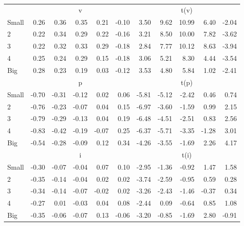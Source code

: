 \begin{table}[!ht]
\begin{tabular}{lrrrrrrrrrr}
  
    
      & \multicolumn{5}{c}{v} & \multicolumn{5}{c}{t(v)}
    
    \\
      \cmidrule(r){2-6} \cmidrule(r){7-11}

    Small   & 0.26  & 0.36  & 0.35  & 0.21  & -0.10  & 3.50  & 9.62  & 10.99  & 6.40  & -2.04  \\
         2  & 0.22  & 0.34  & 0.29  & 0.22  & -0.16  & 3.21  & 8.50  & 10.00  & 7.82  & -3.62  \\
         3  & 0.22  & 0.32  & 0.33  & 0.29  & -0.18  & 2.84  & 7.77  & 10.12  & 8.63  & -3.94  \\
         4  & 0.25  & 0.24  & 0.29  & 0.15  & -0.18  & 3.06  & 5.21  & 8.30  & 4.44  & -3.54  \\
    Big     & 0.28  & 0.23  & 0.19  & 0.03  & -0.12  & 3.53  & 4.80  & 5.84  & 1.02  & -2.41  \\

  
    
      & \multicolumn{5}{c}{p} & \multicolumn{5}{c}{t(p)}
    
    \\
      \cmidrule(r){2-6} \cmidrule(r){7-11}

    Small   & -0.70  & -0.31  & -0.12  & 0.02  & 0.06  & -5.81  & -5.12  & -2.42  & 0.46  & 0.74  \\
         2  & -0.76  & -0.23  & -0.07  & 0.04  & 0.15  & -6.97  & -3.60  & -1.59  & 0.99  & 2.15  \\
         3  & -0.79  & -0.29  & -0.13  & 0.04  & 0.19  & -6.48  & -4.51  & -2.51  & 0.83  & 2.56  \\
         4  & -0.83  & -0.42  & -0.19  & -0.07  & 0.25  & -6.37  & -5.71  & -3.35  & -1.28  & 3.01  \\
    Big     & -0.54  & -0.28  & -0.09  & 0.12  & 0.34  & -4.26  & -3.55  & -1.69  & 2.26  & 4.17  \\

  
    
      & \multicolumn{5}{c}{i} & \multicolumn{5}{c}{t(i)}
    
    \\
      \cmidrule(r){2-6} \cmidrule(r){7-11}

    Small   & -0.30  & -0.07  & -0.04  & 0.07  & 0.10  & -2.95  & -1.36  & -0.92  & 1.47  & 1.58  \\
         2  & -0.35  & -0.14  & -0.04  & 0.02  & 0.02  & -3.74  & -2.59  & -0.95  & 0.59  & 0.28  \\
         3  & -0.34  & -0.14  & -0.07  & -0.02  & 0.02  & -3.26  & -2.43  & -1.46  & -0.37  & 0.34  \\
         4  & -0.27  & 0.01  & -0.03  & 0.04  & 0.08  & -2.44  & 0.09  & -0.64  & 0.85  & 1.08  \\
    Big     & -0.35  & -0.06  & -0.07  & 0.13  & -0.06  & -3.20  & -0.85  & -1.69  & 2.80  & -0.91  \\


  \bottomrule
\end{tabular}
\label{tbl:25_Size_Prior}
\end{table}